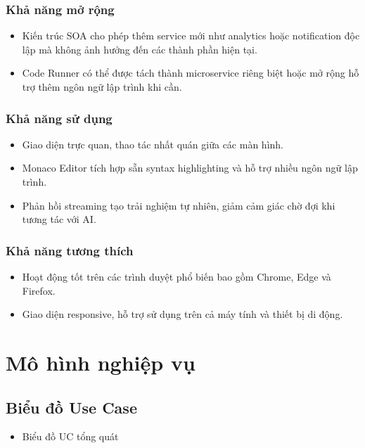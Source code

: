 \documentclass[../main.tex]{subfiles}
\begin{document}
\subsubsection{Khả năng mở rộng}

\begin{itemize}
    \item Kiến trúc SOA cho phép thêm service mới như analytics hoặc notification độc lập mà không ảnh hưởng đến các thành phần hiện tại.
    \item Code Runner có thể được tách thành microservice riêng biệt hoặc mở rộng hỗ trợ thêm ngôn ngữ lập trình khi cần.
\end{itemize}

\subsubsection{Khả năng sử dụng}

\begin{itemize}
    \item Giao diện trực quan, thao tác nhất quán giữa các màn hình.
    \item Monaco Editor tích hợp sẵn syntax highlighting và hỗ trợ nhiều ngôn ngữ lập trình.
    \item Phản hồi streaming tạo trải nghiệm tự nhiên, giảm cảm giác chờ đợi khi tương tác với AI.
\end{itemize}

\subsubsection{Khả năng tương thích}

\begin{itemize}
    \item Hoạt động tốt trên các trình duyệt phổ biến bao gồm Chrome, Edge và Firefox.
    \item Giao diện responsive, hỗ trợ sử dụng trên cả máy tính và thiết bị di động.
\end{itemize}

\section{Mô hình nghiệp vụ}

\subsection{Biểu đồ Use Case}

\begin{itemize}
    \item Biểu đồ UC tổng quát
\end{itemize}
\end{document}

